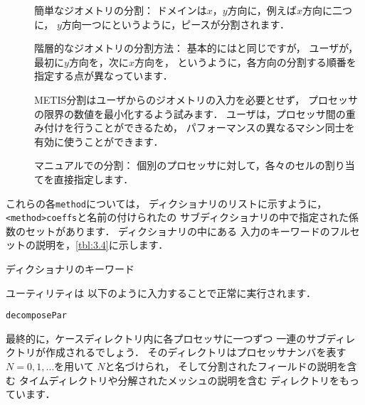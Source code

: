 \begin{description}
 \item[]
%
%
            簡単なジオメトリの分割：
            ドメインは$x$，$y$方向に，例えば$x$方向に二つに，
            $y$方向一つにというように，ピースが分割されます．
 \item[]
%
%
            階層的なジオメトリの分割方法：
            基本的にはと同じですが，
            ユーザが，最初に$y$方向を，次に$x$方向を，
            というように，各方向の分割する順番を指定する点が異なっています．
 \item[]
%
%
            METIS分割はユーザからのジオメトリの入力を必要とせず，
            プロセッサの限界の数値を最小化するよう試みます．
            ユーザは，プロセッサ間の重み付けを行うことができるため，
            パフォーマンスの異なるマシン同士を有効に使うことができます．
 \item[]
%
%
            マニュアルでの分割：
            個別のプロセッサに対して，各々のセルの割り当てを直接指定します．
\end{description}
これらの各\verb|method|については，
ディクショナリのリストに示すように，
\verb|<method>coeffs|と名前の付けられたの
サブディクショナリの中で指定された係数のセットがあります．
ディクショナリの中にある
入力のキーワードのフルセットの説明を，\autoref{tbl:3.4}に示します．


\begin{table}[ht]
 
 \caption{ディクショナリのキーワード}
 \label{tbl:3.4}
\end{table}


%
%
ユーティリティは
以下のように入力することで正常に実行されます．
\begin{OFterminal}
\begin{verbatim}
decomposePar
\end{verbatim}
\end{OFterminal}
最終的に，ケースディレクトリ内に各プロセッサに一つずつ
一連のサブディレクトリが作成されるでしょう．
そのディレクトリはプロセッサナンバを表す$N = 0, 1, \ldots$を用いて
%
%
$N$と名づけられ，
そして分割されたフィールドの説明を含む
タイムディレクトリや分解されたメッシュの説明を含む
ディレクトリをもっています．



